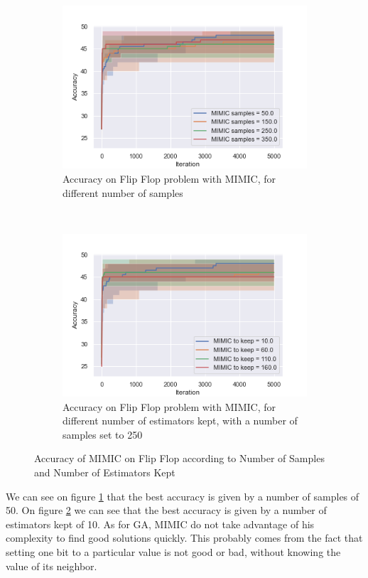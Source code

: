 \documentclass[twocolumn, 10pt]{article}
\begin{document}
				\begin{figure}[h]
					\centering
					\begin{subfigure}[t]{\columnwidth}
						\centering
						\includegraphics[width=0.68\linewidth]{../graphics/flip_flop_MIMIC_Iteration_Error_MIMIC_samples.png}
						\caption{Accuracy on Flip Flop problem with MIMIC, for different number of samples}
						\label{ff:mimic_samples}
					\end{subfigure}
					~
					\begin{subfigure}[t]{\columnwidth}
						\centering
						\includegraphics[width=0.68\linewidth]{../graphics/flip_flop_MIMIC_Iteration_Error_MIMIC_to_keep.png}
						\caption{Accuracy on Flip Flop problem with MIMIC, for different number of estimators kept, with a number of samples set to 250}
						\label{ff:mimic_to_keep}
					\end{subfigure}
					\caption{Accuracy of MIMIC on Flip Flop according to Number of Samples and Number of Estimators Kept}
					\label{ff:mimic}
				\end{figure}

				We can see on figure \ref{ff:mimic_samples} that the best accuracy is given by a number of samples of 50. On figure \ref{ff:mimic_to_keep} we can see that the best accuracy is given by a number of estimators kept of 10. As for GA, MIMIC do not take advantage of his complexity to find good solutions quickly. This probably comes from the fact that setting one bit to a particular value is not good or bad, without knowing the value of its neighbor.
\end{document}

